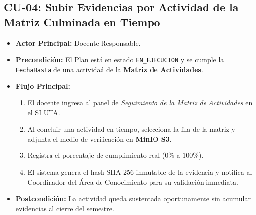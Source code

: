 \documentclass[12pt,a4paper]{article}
\begin{document}
\subsection{CU-04: Subir Evidencias por Actividad de la Matriz Culminada en Tiempo}
\begin{itemize}[leftmargin=1.5em, itemsep=2pt]
    \item \textbf{Actor Principal:} Docente Responsable.
    \item \textbf{Precondición:} El Plan está en estado \texttt{EN\_EJECUCION} y se cumple la \texttt{FechaHasta} de una actividad de la \textbf{Matriz de Actividades}.
    \item \textbf{Flujo Principal:}
    \begin{enumerate}[leftmargin=1.2em, itemsep=1.5pt]
        \item El docente ingresa al panel de \textit{Seguimiento de la Matriz de Actividades} en el SI UTA.
        \item Al concluir una actividad en tiempo, selecciona la fila de la matriz y adjunta el medio de verificación en \textbf{MinIO S3}.
        \item Registra el porcentaje de cumplimiento real ($0\%$ a $100\%$).
        \item El sistema genera el hash SHA-256 inmutable de la evidencia y notifica al Coordinador del Área de Conocimiento para su validación inmediata.
    \end{enumerate}
    \item \textbf{Postcondición:} La actividad queda sustentada oportunamente sin acumular evidencias al cierre del semestre.
\end{itemize}
\end{document}
